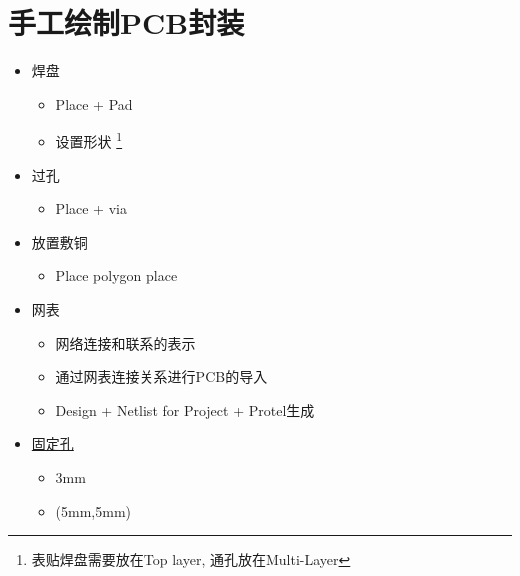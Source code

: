 \documentclass[11pt]{article}
\begin{document}
\section{手工绘制PCB封装}
\label{sec:orgbdc762d}
\begin{itemize}
\item 焊盘
\begin{itemize}
\item Place + Pad
\item 设置形状 \footnote{表贴焊盘需要放在Top layer, 通孔放在Multi-Layer}
\end{itemize}
\item 过孔
\begin{itemize}
\item Place + via
\end{itemize}
\item 放置敷铜
\begin{itemize}
\item Place polygon place
\end{itemize}
\item 网表
\begin{itemize}
\item 网络连接和联系的表示
\item 通过网表连接关系进行PCB的导入
\item Design + Netlist for Project + Protel生成
\end{itemize}
\item \uline{固定孔}
\begin{itemize}
\item 3mm
\item (5mm,5mm)
\end{itemize}
\end{itemize}
\end{document}
